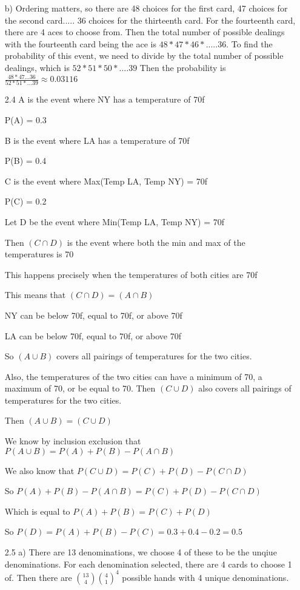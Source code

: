 \documentclass[11pt]{article}
\begin{document}
\begin{itemize}
	b) Ordering matters, so there are 48 choices for the first card, 47 choices for the second card..... 36 choices for the thirteenth card. For the fourteenth card, there are 4 aces to choose from. Then the total number of possible dealings with the fourteenth card being the ace is $48*47*46*.....36$. To find the probability of this event, we need to divide by the total number of possible dealings, which is $52*51*50*....39$
	Then the probability is $\frac{48*47...36}{52*51*...39} \approx 0.03116$
\item[2.4]
  A is the event where NY has a temperature of 70f

  P(A) = 0.3

  B is the event where LA has a temperature of 70f

  P(B) = 0.4

  C is the event where Max(Temp LA, Temp NY) = 70f

  P(C) = 0.2

  Let D be the event where Min(Temp LA, Temp NY) = 70f

  Then $(C \cap D)$ is the event where both the min and max of the temperatures is 70

  This happens precisely when the temperatures of both cities are 70f

  This means that $(C \cap D) = (A \cap B)$

  NY can be below 70f, equal to 70f, or above 70f

  LA can be below 70f, equal to 70f, or above 70f

  So $(A \cup B)$ covers all pairings of temperatures for the two cities.

  Also, the temperatures of the two cities can have a minimum of 70, a maximum of 70, or be equal to 70. Then $(C \cup D)$ also covers all pairings of temperatures for the two cities.

  Then $(A \cup B) = (C \cup D)$

  We know by inclusion exclusion that $P(A \cup B) = P(A) + P(B) - P(A \cap B)$

  We also know that $P(C \cup D) = P(C) + P(D) - P(C \cap D)$

  So $P(A) + P(B) - P(A \cap B) = P(C) + P(D) - P(C \cap D)$

  Which is equal to $P(A) + P(B) = P(C) + P(D)$

  So $P(D) = P(A) + P(B) - P(C) = 0.3 + 0.4 - 0.2 = 0.5$
\item[2.5]
	a) There are 13 denominations, we choose 4 of these to be the unqiue denominations. For each denomination selected, there are 4 cards to choose 1 of. Then there are $\binom{13}{4} {\binom{4}{1}}^4$ possible hands with 4 unique denominations. 


\end{itemize}
\end{document}
